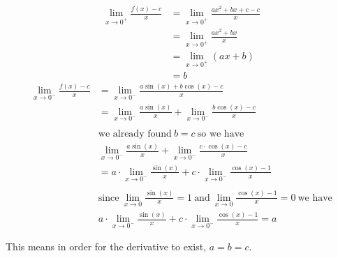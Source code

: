 \documentclass[nooutcomes,handout]{ximera}
\begin{document}
\begin{problem}
\begin{freeResponse}
		\begin{align*}
		\lim_{x\to 0^+} \frac{f(x)-c}{x}&=\lim_{x\to 0^+} \frac{ax^2+bx+c-c}{x}\\
		&=\lim_{x\to 0^+} \frac{ax^2+bx}{x}\\
		&=\lim_{x\to 0^+} (ax+b)\\
		&=b
		\end{align*}
		\begin{align*}
		\lim_{x\to 0^-} \frac{f(x)-c}{x}&=\lim_{x\to 0^-} \frac{a \sin(x)+b \cos(x)-c}{x}\\
		&=\lim_{x\to 0^-} \frac{a \sin(x)}{x}+\lim_{x\to 0^-} \frac{b\cos(x)-c}{x}\\ \\
		& \text{we already found}\ b=c \ \text{so we have}\\
		&\lim_{x\to 0^-} \frac{a \sin(x)}{x}+\lim_{x\to 0^-} \frac{c\cdot \cos(x)-c}{x}\\
		&=a\cdot \lim_{x\to 0^-} \frac{ \sin(x)}{x}+c \cdot \lim_{x\to 0^-} \frac{\cos(x)-1}{x}\\ \\
		& \text{since}\ \lim_{x\to 0} \frac{\sin(x)}{x}=1\ \text{and}\  \lim_{x\to 0} \frac{\cos(x)-1}{x}=0 \ \text{we have}\\
		&a\cdot \lim_{x\to 0^-} \frac{\sin(x)}{x}+c \cdot \lim_{x\to 0^-} \frac{\cos(x)-1}{x}=a
		\end{align*}

		This means in order for the derivative to exist, $a=b=c$.
		\end{freeResponse}
\end{problem}	
\end{document}
